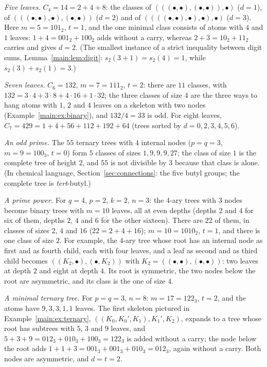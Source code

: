 \documentclass[11pt]{article}
\theoremstyle{definition}
\theoremstyle{remark}
\numberwithin{equation}{section}
\numberwithin{figure}{section}
\begin{document}
\emph{Five leaves.} $C_4=14=2+4+8$: the classes of $(((\bullet,\bullet),(\bullet,\bullet)),\bullet)$ ($d=1$),
of $(((\bullet,\bullet),\bullet),(\bullet,\bullet))$ ($d=2$) and of $((((\bullet,\bullet),\bullet),\bullet),\bullet)$
($d=3$). Here $m=5=101_2$, $t=1$, and the one minimal class consists of atoms with $4$ and $1$ leaves:
$1+4=001_2+100_2$ adds without a carry, whereas $2+3=10_2+11_2$ carries and gives $d=2$. (The smallest
instance of a strict inequality between digit sums, Lemma~\ref{main:lem:digit}: $s_2(3+1)=s_2(4)=1$,
while $s_2(3)+s_2(1)=3$.)

\emph{Seven leaves.} $C_6=132$, $m=7=111_2$, $t=2$: there are $11$ classes, with $132=3\cdot4+3\cdot8+4\cdot16+1\cdot32$;
the three classes of size $4$ are the three ways to hang atoms with $1$, $2$ and $4$ leaves on a skeleton with
two nodes (Example~\ref{main:ex:binary}), and $132/4=33$ is odd. For eight leaves,
$C_7=429=1+4+56+112+192+64$ (trees sorted by $d=0,2,3,4,5,6$).

\emph{An odd prime.} The $55$ ternary trees with $4$ internal nodes ($p=q=3$, $m=9=100_3$, $t=0$) form $5$
classes of sizes $1,9,9,9,27$; the class of size $1$ is the complete tree of height $2$, and $55$ is not
divisible by $3$ because that class is alone. (In chemical language, Section~\ref{sec:connections}: the five
butyl groups; the complete tree is \emph{tert}-butyl.)

\emph{A prime power.} For $q=4$, $p=2$, $k=2$, $n=3$: the $4$-ary trees with $3$ nodes become binary trees with
$m=10$ leaves, all at even depths (depths $2$ and $4$ for six of them, depths $2$, $4$ and $6$ for the other
sixteen). There are $22$ of them, in classes of sizes $2$, $4$ and $16$
($22=2+4+16$); $m=10=1010_2$, $t=1$, and there is one class of size $2$.
For example, the $4$-ary tree whose root has an internal node as first and as fourth child, each with four
leaves, and a leaf as second and as third child becomes $((K_2,\bullet),(\bullet,K_2))$ with
$K_2=((\bullet,\bullet),(\bullet,\bullet))$: two leaves at depth $2$ and eight at depth $4$. Its root is
symmetric, the two nodes below the root are asymmetric, and its class is the one of size $4$.

\emph{A minimal ternary tree.} For $p=q=3$, $n=8$: $m=17=122_3$, $t=2$, and the atoms have $9,3,3,1,1$ leaves.
The first skeleton pictured in Example~\ref{main:ex:ternary}, $((K_0,K_0',K_1),K_1',K_2)$, expands to a tree
whose root has subtrees with $5$, $3$ and $9$ leaves, and $5+3+9=012_3+010_3+100_3=122_3$ is added without a
carry; the node below the root adds $1+1+3=001_3+001_3+010_3=012_3$, again without a carry. Both nodes are
asymmetric, and $d=t=2$.
\end{document}
